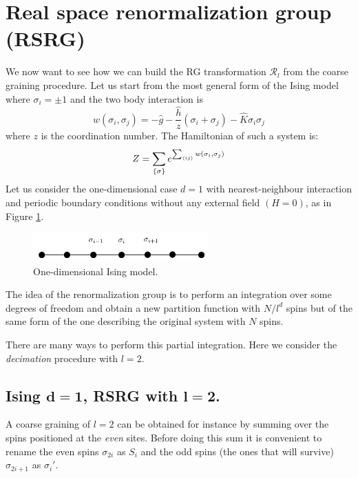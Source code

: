 \documentclass[../main/main.tex]{subfiles}
\begin{document}
\section{Real space renormalization group (RSRG)}
We now want to see how we can build the RG transformation \( \mathcal{R}_l \) from the coarse graining procedure.
Let us start from the most general form of the Ising model where \( \sigma _i = \pm 1 \) and the two body interaction is
\begin{equation}
  w (\sigma _i, \sigma _j) = - \hat{g} - \frac{\hat{h} }{z} (\sigma _i + \sigma _j) - \hat{K} \sigma _i \sigma _j
\end{equation}
where \( z \) is the coordination number. The Hamiltonian of such a system is:
\begin{equation}
  Z = \sum_{\{ \sigma  \}  }^{}  e^{\sum_{\expval{ij} }^{}  w (\sigma _i, \sigma _j)}
\end{equation}
Let us consider the one-dimensional case \( d=1 \)  with nearest-neighbour interaction and periodic boundary conditions without any external field \( (H=0) \), as in Figure \ref{fig:20_4}.

\begin{figure}[h!]
\centering
\includegraphics[width=0.6\textwidth]{../lessons/20_image/4.pdf}
\caption{\label{fig:20_4} One-dimensional Ising model.}
\end{figure}

The idea of the renormalization group is to perform an integration over some degrees of freedom and obtain a new partition function with \( N/l^d \) spins but of the same form of the one describing the original system with \( N \) spins.

There are many ways to perform this partial integration. Here we consider the \emph{decimation} procedure with \( l=2 \).

\subsection{Ising \( \pmb{d=1} \), RSRG with \( \pmb{l=2} \).}
A coarse graining of \( l=2  \) can be obtained for instance by summing over the spins positioned at the \emph{even} sites. Before doing this sum it is convenient to rename the even spins \( \sigma _{2i} \) as \( S_i \) and the odd spins (the ones that will survive) \( \sigma _{2i+1} \) as \( \sigma _i' \).
\end{document}
